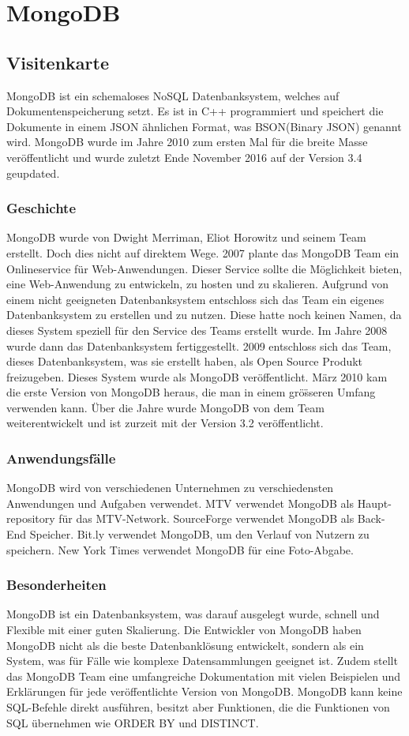 \section{MongoDB}
\subsection{Visitenkarte} 
MongoDB ist ein schemaloses NoSQL Datenbanksystem, welches auf Dokumentenspeicherung setzt. Es ist in C++ programmiert\cite{Boicea01} und speichert die Dokumente in einem JSON \"ahnlichen Format, was BSON(Binary JSON) genannt wird. MongoDB wurde im Jahre 2010 zum ersten Mal f\"ur die breite Masse ver\"offentlicht und wurde zuletzt Ende November 2016 auf der Version 3.4 geupdated.\cite{mongo01}
\subsubsection{Geschichte}
MongoDB wurde von Dwight Merriman, Eliot Horowitz und seinem Team erstellt. Doch dies nicht auf direktem Wege. 2007 plante das MongoDB Team ein Onlineservice f\"ur Web-Anwendungen. Dieser Service sollte die M\"oglichkeit bieten, eine Web-Anwendung zu entwickeln, zu hosten und zu skalieren. Aufgrund von einem nicht geeigneten Datenbanksystem entschloss sich das Team ein eigenes Datenbanksystem zu erstellen und zu nutzen. Diese hatte noch keinen Namen, da dieses System speziell f\"ur den Service des Teams erstellt wurde. Im Jahre 2008 wurde dann das Datenbanksystem fertiggestellt. 2009 entschloss sich das Team, dieses Datenbanksystem, was sie erstellt haben, als Open Source Produkt freizugeben. Dieses System wurde als MongoDB ver\"offentlicht. M\"arz 2010 kam die erste Version von MongoDB heraus, die man in einem gr\"o\"sseren Umfang verwenden kann. \"Uber die Jahre wurde MongoDB von dem Team weiterentwickelt und ist zurzeit mit der Version 3.2 ver\"offentlicht.\cite{Shakuntala01}
\subsubsection{Anwendungsf\"alle}
MongoDB wird von verschiedenen Unternehmen zu verschiedensten Anwendungen und Aufgaben verwendet.
MTV verwendet MongoDB als Haupt-repository f\"ur das MTV-Network.
SourceForge verwendet MongoDB als Back-End Speicher.
Bit.ly verwendet MongoDB, um den Verlauf von Nutzern zu speichern.
New York Times verwendet MongoDB  f\"ur eine Foto-Abgabe.\cite{Boicea01}
\subsubsection{Besonderheiten}
MongoDB ist ein Datenbanksystem, was darauf ausgelegt wurde, schnell und Flexible mit einer guten Skalierung. Die Entwickler von MongoDB haben MongoDB nicht als die beste Datenbankl\"osung entwickelt, sondern als ein System, was f\"ur F\"alle wie komplexe Datensammlungen geeignet ist. Zudem stellt das MongoDB Team eine umfangreiche Dokumentation mit vielen Beispielen und Erkl\"arungen f\"ur jede ver\"offentlichte Version von MongoDB. MongoDB kann keine SQL-Befehle direkt ausf\"uhren, besitzt aber Funktionen, die die Funktionen von SQL \"ubernehmen wie ORDER BY und DISTINCT.
